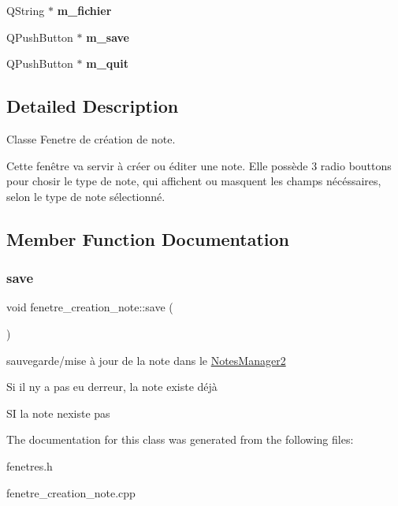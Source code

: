 \begin{DoxyCompactItemize}
\mbox{\label{classfenetre__creation__note_ada8843b6be5dd2dff4d99fade6bfada4}} 
Q\+String $\ast$ {\bfseries m\+\_\+fichier}
\item 
\mbox{\label{classfenetre__creation__note_adfe8b007cfc3075e77c3a1030571cbf5}} 
Q\+Push\+Button $\ast$ {\bfseries m\+\_\+save}
\item 
\mbox{\label{classfenetre__creation__note_ab3d04eb71646774146d2c12e8f0a53ec}} 
Q\+Push\+Button $\ast$ {\bfseries m\+\_\+quit}
\end{DoxyCompactItemize}


\subsection{Detailed Description}
Classe Fenetre de création de note. 

Cette fenêtre va servir à créer ou éditer une note. Elle possède 3 radio bouttons pour chosir le type de note, qui affichent ou masquent les champs nécéssaires, selon le type de note sélectionné. 

\subsection{Member Function Documentation}
\mbox{\label{classfenetre__creation__note_a148abe3a7d3ba11210f456d4cddce196}} 
\subsubsection{\texorpdfstring{save}{save}}
{\footnotesize\ttfamily void fenetre\+\_\+creation\+\_\+note\+::save (\begin{DoxyParamCaption}{ }\end{DoxyParamCaption})\hspace{0.3cm}{\ttfamily [slot]}}



sauvegarde/mise à jour de la note dans le \hyperlink{class_notes_manager2}{Notes\+Manager2} 

Si il n\textquotesingle{}y a pas eu d\textquotesingle{}erreur, la note existe déjà

SI la note n\textquotesingle{}existe pas 

The documentation for this class was generated from the following files\+:\begin{DoxyCompactItemize}
\item 
fenetres.\+h\item 
fenetre\+\_\+creation\+\_\+note.\+cpp\end{DoxyCompactItemize}
